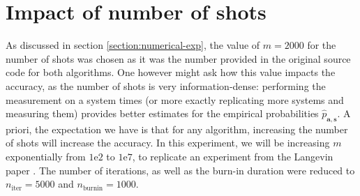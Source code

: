 \documentclass[12pt]{memoir}
\newcommand{\mb}{\mathbf}
\newcommand{\nitern}[1]{$n_{\text{iter}}=#1$}
\newcommand{\nburninn}[1]{$n_{\text{burnin}}=#1$}
\begin{document}
\section{Impact of number of shots}\label{section:comp-nb-shots}

As discussed in section \ref{section:numerical-exp}, the value of $m=2000$ for the number of shots was chosen as it was the number provided in the original source code for both algorithms. One however might ask how this value impacts the accuracy, as the number of shots is very information-dense: performing the measurement on a system times (or more exactly replicating more systems and measuring them) provides better estimates for the empirical probabilities $\hat p_{\mb a, \mb s}$. A priori, the expectation we have is that for any algorithm, increasing the number of shots will increase the accuracy. In this experiment, we will be increasing $m$ exponentially from $1\text{e}2$ to $1\text{e}7$, to replicate an experiment from the Langevin paper \cite{meth:bayesian:Langevin:ACMT2024}. The number of iterations, as well as the burn-in duration were reduced to \nitern{5000} and \nburninn{1000}.
\end{document}
